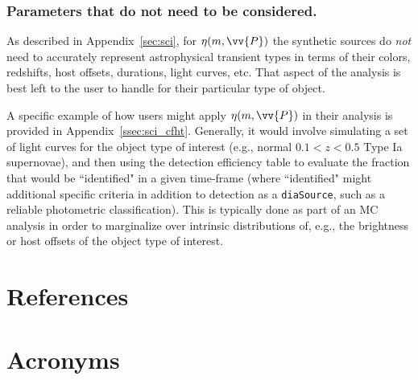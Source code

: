 \documentclass[DM,authoryear,toc]{lsstdoc}
\begin{document}
\subsubsection{Parameters that do not need to be considered.}\label{sssec:dedp_pars_no}

As described in Appendix~\ref{sec:sci}, for $\eta(m,\vv{P})$ the synthetic sources do {\it not} need to accurately represent astrophysical transient types in terms of their colors, redshifts, host offsets, durations, light curves, etc.
That aspect of the analysis is best left to the user to handle for their particular type of object.

A specific example of how users might apply $\eta(m,\vv{P})$ in their analysis is provided in Appendix~\ref{ssec:sci_cfht}.
Generally, it would involve simulating a set of light curves for the object type of interest (e.g., normal $0.1<z<0.5$ Type Ia supernovae), and then using the detection efficiency table to evaluate the fraction that would be ``identified" in a given time-frame (where ``identified" might additional specific criteria in addition to detection as a {\tt diaSource}, such as a reliable photometric classification).
This is typically done as part of an MC analysis in order to marginalize over intrinsic distributions of, e.g., the brightness or host offsets of the object type of interest.


\appendix
\section{References} \label{sec:bib}
\renewcommand{\refname}{} %


\section{Acronyms} \label{sec:acronyms}



\clearpage


\clearpage


\clearpage


\clearpage


\clearpage

\end{document}
